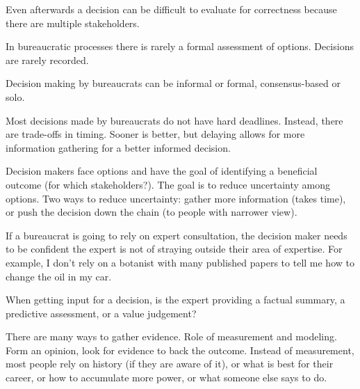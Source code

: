 Even afterwards a decision can be difficult to evaluate for correctness because there are multiple stakeholders.

In bureaucratic processes there is rarely a formal assessment of options. 
Decisions are rarely recorded. 

Decision making by bureaucrats can be informal or formal, consensus-based or solo. 

Most decisions made by bureaucrats do not have hard deadlines. Instead, there are trade-offs in timing. Sooner is better, but delaying allows for more information gathering for a better informed decision.




Decision makers face options and have the goal of identifying a beneficial outcome (for which stakeholders?). The goal is to reduce uncertainty among options. Two ways to reduce uncertainty: gather more information (takes time), or push the decision down the chain (to people with narrower view). 

If a bureaucrat is going to rely on expert consultation, the decision maker needs to be confident the expert is not of straying outside their area of expertise. For example, I don't rely on a botanist with many published papers to tell me how to change the oil in my car. 

When getting input for a decision, is the expert providing a factual summary, a predictive assessment, or a value judgement? 

There are many ways to gather evidence. 
Role of measurement and modeling. 
Form an opinion, look for evidence to back the outcome.
Instead of measurement, most people rely on history (if they are aware of it), or what is best for their career, or how to accumulate more power, or what someone else says to do.  
